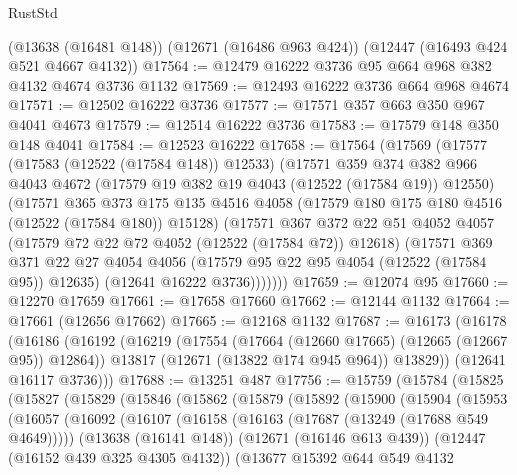\begin{lexlean}{RustStd}
\begin{coremodule}
    (@13638 (@16481 @148))
    (@12671 (@16486 @963 @424))
    (@12447 (@16493 @424 @521 @4667 @4132))
@17564 := @12479 @16222 @3736 @95 @664 @968 @382 @4132 @4674 @3736 @1132
@17569 := @12493 @16222 @3736 @664 @968 @4674
@17571 := @12502 @16222 @3736
@17577 := @17571 @357 @663 @350 @967 @4041 @4673
@17579 := @12514 @16222 @3736
@17583 := @17579 @148 @350 @148 @4041
@17584 := @12523 @16222
@17658 := @17564
    (@17569
      (@17577
        (@17583 (@12522 (@17584 @148)) @12533)
        (@17571
          @359
          @374
          @382
          @966
          @4043
          @4672
          (@17579 @19 @382 @19 @4043 (@12522 (@17584 @19)) @12550)
          (@17571
            @365
            @373
            @175
            @135
            @4516
            @4058
            (@17579 @180 @175 @180 @4516 (@12522 (@17584 @180)) @15128)
            (@17571
              @367
              @372
              @22
              @51
              @4052
              @4057
              (@17579 @72 @22 @72 @4052 (@12522 (@17584 @72)) @12618)
              (@17571
                @369
                @371
                @22
                @27
                @4054
                @4056
                (@17579 @95 @22 @95 @4054 (@12522 (@17584 @95)) @12635)
                (@12641 @16222 @3736)))))))
@17659 := @12074 @95
@17660 := @12270 @17659
@17661 := @17658 @17660
@17662 := @12144 @1132
@17664 := @17661 (@12656 @17662)
@17665 := @12168 @1132
@17687 := @16173
    (@16178
      (@16186
        (@16192
          (@16219
            (@17554 (@17664 (@12660 @17665) (@12665 (@12667 @95)) @12864))
            @13817
            (@12671 (@13822 @174 @945 @964))
            @13829))
        (@12641 @16117 @3736)))
@17688 := @13251 @487
@17756 := @15759
    (@15784
      (@15825
        (@15827
          (@15829
            (@15846
              (@15862
                (@15879
                  (@15892
                    (@15900
                      (@15904
                        (@15953
                          (@16057
                            (@16092
                              (@16107
                                (@16158 (@16163 (@17687 (@13249 (@17688 @549 @4649)))))
                                (@13638 (@16141 @148))
                                (@12671 (@16146 @613 @439))
                                (@12447 (@16152 @439 @325 @4305 @4132))
                                (@13677
                                  @15392
                                  @644
                                  @549
                                  @4132

\end{coremodule}
\end{lexlean}
